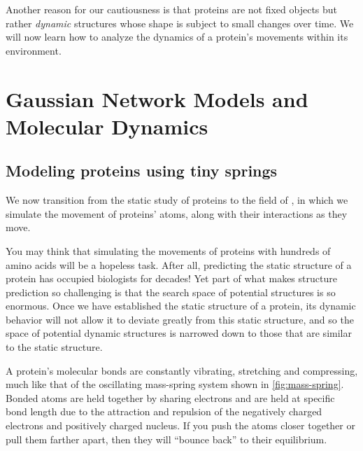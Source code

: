 Another reason for our cautiousness is that proteins are not fixed objects but rather \textit{dynamic} structures whose shape is subject to small changes over time. We will now learn how to analyze the dynamics of a protein's movements within its environment.\\

\FloatBarrier
{}

\section{Gaussian Network Models and Molecular Dynamics}
\label{sec:gaussian_network_models}
\subsection{Modeling proteins using tiny springs}

We now transition from the static study of proteins to the field of , in which we simulate the movement of proteins' atoms, along with their interactions as they move.

You may think that simulating the movements of proteins with hundreds of amino acids will be a hopeless task. After all, predicting the static structure of a protein has occupied biologists for decades! Yet part of what makes structure prediction so challenging is that the search space of potential structures is so enormous. Once we have established the static structure of a protein, its dynamic behavior will not allow it to deviate greatly from this static structure, and so the space of potential dynamic structures is narrowed down to those that are similar to the static structure.

A protein's molecular bonds are constantly vibrating, stretching and compressing, much like that of the oscillating mass-spring system shown in \autoref{fig:mass-spring}. Bonded atoms are held together by sharing electrons and are held at specific bond length due to the attraction and repulsion of the negatively charged electrons and positively charged nucleus. If you push the atoms closer together or pull them farther apart, then they will ``bounce back'' to their equilibrium.\\

